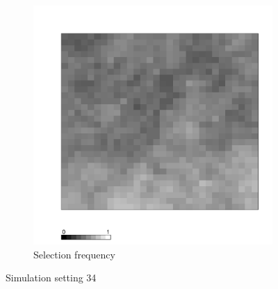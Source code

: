 \documentclass[authoryear, review, 11pt]{elsarticle}
\begin{document}
\begin{figure}
	\begin{subfigure}[b]{0.45\textwidth}
	\centering
		\includegraphics[width=\textwidth]{../../figures/simulation/X1.15.34.selection.pdf}
		\caption{Selection frequency}
	\end{subfigure}
	\caption{Simulation setting 34}
\end{figure}
\end{document}
